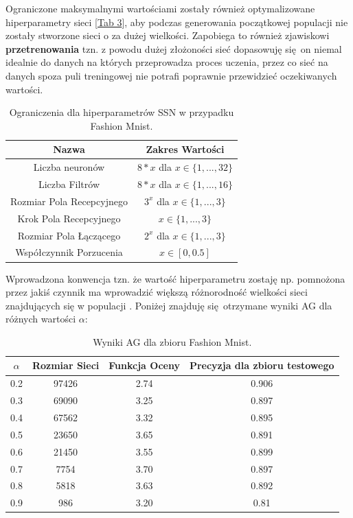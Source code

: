 \documentclass{article}
\begin{document}
Ograniczone maksymalnymi wartościami zostały również optymalizowane hiperparametry sieci 
[\hyperref[tab:zakres]{Tab 3}], aby podczas generowania początkowej populacji 
nie zostały stworzone sieci o za dużej wielkości. Zapobiega to również zjawiskowi 
\textbf{przetrenowania} tzn. z powodu dużej złożoności sieć dopasowuję się on niemal idealnie
do danych na których przeprowadza proces uczenia, przez co sieć na danych spoza puli treningowej
nie potrafi poprawnie przewidzieć oczekiwanych wartości.

\begin{table}[H]
\centering
\begin{tabular}{|c|c|}
	\hline
	Nazwa & Zakres Wartości  \\
	\hline
	Liczba neuronów           & $8*x$ dla $x\in \{1, ...,32\}$\\
	Liczba Filtrów            & $8*x$ dla $x\in \{1, ...,16\}$\\
	Rozmiar Pola Recepcyjnego & $3^x$ dla $x \in \{1, ...,3\}$\\
	Krok Pola Recepcyjnego    & $x \in \{1, ...,3\}$\\
	Rozmiar Pola Łączącego    & $2^x$ dla $x \in \{1, ...,3\}$\\
	Współczynnik Porzucenia   & $x \in [0, 0.5]$\\
	\hline
\end{tabular}
\caption{\label{tab:fm_zakres}Ograniczenia dla hiperparametrów SSN w przypadku Fashion Mnist.}
\end{table}
Wprowadzona konwencja tzn. że wartość hiperparametru zostaję np. pomnożona przez jakiś czynnik
ma wprowadzić większą różnorodność wielkości sieci znajdujących się w populacji 
\cite{ams}.
Poniżej znajduję się otrzymane wyniki AG dla różnych wartości $\alpha$:\\
\begin{table}[H]
\centering
\begin{tabular}{|c|c|c|c|}
        \hline
	$\alpha$ & Rozmiar Sieci & Funkcja Oceny & Precyzja dla zbioru testowego\\
	\hline
	0.2 & 97426 & 2.74 & 0.906 \\
	0.3 & 69090 & 3.25  & 0.897 \\
	0.4 & 67562 & 3.32 & 0.895 \\
	0.5 & 23650 & 3.65 & 0.891 \\
	0.6 & 21450 & 3.55 & 0.899 \\
	0.7 & 7754 & 3.70 & 0.897 \\
	0.8 & 5818 &  3.63 & 0.892 \\
	0.9 & 986 & 3.20 & 0.81 \\
	\hline
\end{tabular}
\caption{\label{tab:fmres}Wyniki AG dla zbioru Fashion Mnist.}
\end{table}
\end{document}
